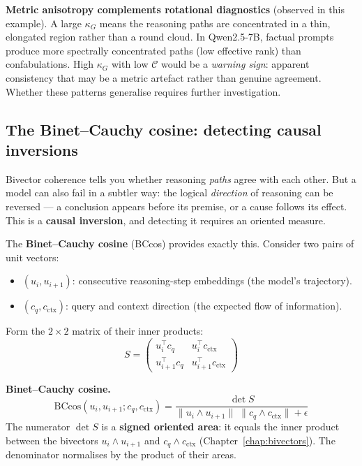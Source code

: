 \documentclass[11pt, twoside, openright]{memoir}
\newcommand{\op}{\wedge}          %
\numberwithin{equation}{chapter}
\begin{document}
\begin{finding}
\textbf{Metric anisotropy complements rotational diagnostics}
(observed in this example).
A large $\kappa_G$ means the reasoning paths are concentrated in a
thin, elongated region rather than a round cloud.  In Qwen2.5-7B,
factual prompts produce more spectrally concentrated paths (low
effective rank) than confabulations.  High $\kappa_G$ with low
$\mathcal{C}$ would be a \emph{warning sign}: apparent consistency
that may be a metric artefact rather than genuine agreement.  Whether
these patterns generalise requires further investigation.
\end{finding}

\subsection{The Binet--Cauchy cosine: detecting causal inversions}

Bivector coherence tells you whether reasoning \emph{paths} agree with
each other.  But a model can also fail in a subtler way: the logical
\emph{direction} of reasoning can be reversed --- a conclusion appears
before its premise, or a cause follows its effect.  This is a
\textbf{causal inversion}, and detecting it requires an oriented
measure.

The \textbf{Binet--Cauchy cosine} (BCcos) provides exactly this.
Consider two pairs of unit vectors:
\begin{itemize}[nosep]
\item $(u_i, u_{i+1})$: consecutive reasoning-step embeddings
  (the model's trajectory).
\item $(c_q, c_{\text{ctx}})$: query and context direction
  (the expected flow of information).
\end{itemize}

Form the $2 \times 2$ matrix of their inner products:
\begin{equation}
  S = \begin{pmatrix}
    u_i^\top c_q & u_i^\top c_{\text{ctx}} \\
    u_{i+1}^\top c_q & u_{i+1}^\top c_{\text{ctx}}
  \end{pmatrix}
\end{equation}

\begin{gabox}
\textbf{Binet--Cauchy cosine.}
\begin{equation}
  \text{BCcos}(u_i, u_{i+1}; c_q, c_{\text{ctx}})
  = \frac{\det S}{\|u_i \op u_{i+1}\| \; \|c_q \op c_{\text{ctx}}\|
    + \epsilon}
\end{equation}
The numerator $\det S$ is a \textbf{signed oriented area}: it equals
the inner product between the bivectors $u_i \op u_{i+1}$ and
$c_q \op c_{\text{ctx}}$ (Chapter~\ref{chap:bivectors}).  The denominator normalises by the product
of their areas.
\end{gabox}
\end{document}
